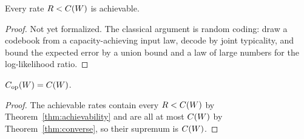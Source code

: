 \begin{theorem}[Achievability]
  \label{thm:achievability}
  \leanok
  Every rate $R < C(W)$ is achievable.
\end{theorem}
\begin{proof}
  Not yet formalized.  The classical argument is random coding: draw a codebook from a
  capacity-achieving input law, decode by joint typicality, and bound the expected error by a union
  bound and a law of large numbers for the log-likelihood ratio.
\end{proof}

\begin{theorem}
  \label{thm:coding_theorem}
  \leanok
  $C_{\mathrm{op}}(W) = C(W)$.
\end{theorem}
\begin{proof}
  \leanok
  The achievable rates contain every $R < C(W)$ by Theorem~\ref{thm:achievability} and are all at
  most $C(W)$ by Theorem~\ref{thm:converse}, so their supremum is $C(W)$.
\end{proof}
